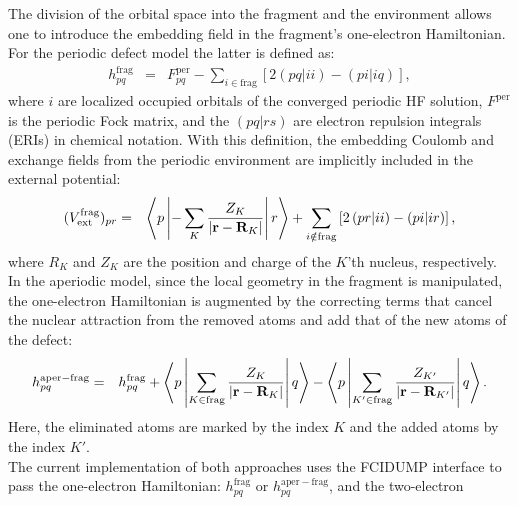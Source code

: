\documentclass[a4paper,11pt,headings=normal]{scrartcl}
\begin{document}
\begin{itemize}
The division of the orbital space into the fragment and the environment allows 
one to introduce the embedding field in the fragment's one-electron 
Hamiltonian. For the periodic defect model the latter is defined as:
\begin{eqnarray}
h^{\mathrm{frag}}_{pq}&=&F^{\mathrm{per}}_{pq}-\sum_{i\in{\mathrm{frag}}}\left[2\left(pq|ii\right)
  - \left(p i|i q\right)\right],\label{eq:h_frag}
\end{eqnarray}
where $i$ are localized occupied
orbitals of the converged periodic HF solution, $F^{\mathrm{per}}$ is the 
periodic Fock matrix, and the $(pq|rs)$ are electron repulsion integrals (ERIs) 
in chemical notation. With this definition, the embedding Coulomb and exchange 
fields from the periodic environment are implicitly included in the external 
potential:
\begin{eqnarray}
(V^{\mathrm{frag}}_{\mathrm{ext}})_{pr}&=& \left<p\left| -\sum_{K}{Z_K \over 
|{\mathbf r}-{\mathbf 
R}_K|}\right|r\right>+\sum_{i\notin{\mathrm{frag}}}\left[2\left(pr|ii\right) - 
\left(p i|i r\right)\right],\label{eq:Vext_frag}
\end{eqnarray}
where $R_K$ and $Z_K$ are the position and charge of the $K$'th nucleus, 
respectively.\\
In the aperiodic model, since the local geometry in the fragment is 
manipulated, the one-electron Hamiltonian is augmented by the correcting 
terms that cancel the nuclear attraction from the removed atoms and add that of 
the new atoms of the defect: 
\begin{eqnarray}
h^{\mathrm{aper-frag}}_{pq}&=&h^{\mathrm{frag}}_{pq} + \left< p\left| \sum_{K\in{\mathrm{frag}}}{Z_{K} \over |{\mathbf r}-{\mathbf
    R}_{K}|}\right|q\right>-\left< p\left| \sum_{K'\in{\mathrm{frag}}}{Z_{K'} \over |{\mathbf r}-{\mathbf
                           R}_{K'}|}\right|q\right>.\label{eq:defect_h}
\end{eqnarray}
Here, the eliminated atoms are marked by the index $K$ and the added atoms by 
the index $K'$.\\
The current implementation of both approaches uses the FCIDUMP 
interface\autocite{Handy1989a} to pass the one-electron Hamiltonian: $h^{\mathrm{frag}}_{pq}$ or $h^{\mathrm{aper-frag}}_{pq}$, and the two-electron 

\end{itemize}
\end{document}
